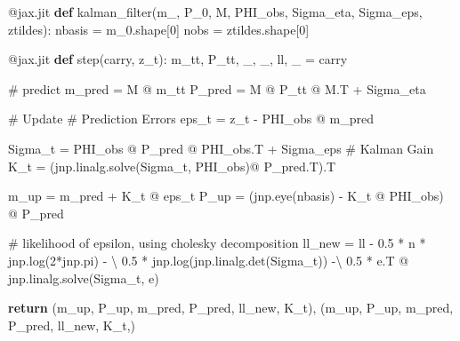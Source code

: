 \documentclass[
]{report}
\newenvironment{Shaded}{\begin{snugshade}}{\end{snugshade}}
\newcommand{\AttributeTok}[1]{\textcolor[rgb]{0.40,0.45,0.13}{#1}}
\newcommand{\CommentTok}[1]{\textcolor[rgb]{0.37,0.37,0.37}{#1}}
\newcommand{\ControlFlowTok}[1]{\textcolor[rgb]{0.00,0.23,0.31}{\textbf{#1}}}
\newcommand{\DecValTok}[1]{\textcolor[rgb]{0.68,0.00,0.00}{#1}}
\newcommand{\FloatTok}[1]{\textcolor[rgb]{0.68,0.00,0.00}{#1}}
\newcommand{\KeywordTok}[1]{\textcolor[rgb]{0.00,0.23,0.31}{\textbf{#1}}}
\newcommand{\NormalTok}[1]{\textcolor[rgb]{0.00,0.23,0.31}{#1}}
\newcommand{\OperatorTok}[1]{\textcolor[rgb]{0.37,0.37,0.37}{#1}}
\theoremstyle{plain}
\theoremstyle{plain}
\theoremstyle{plain}
\theoremstyle{remark}
\begin{document}
\begin{Shaded}
\begin{Highlighting}[]
\AttributeTok{@jax.jit}
\KeywordTok{def}\NormalTok{ kalman\_filter(m\_, P\_0, M, PHI\_obs, Sigma\_eta, Sigma\_eps, ztildes):}
\NormalTok{    nbasis }\OperatorTok{=}\NormalTok{ m\_0.shape[}\DecValTok{0}\NormalTok{]}
\NormalTok{    nobs }\OperatorTok{=}\NormalTok{ ztildes.shape[}\DecValTok{0}\NormalTok{]}

    \AttributeTok{@jax.jit}
    \KeywordTok{def}\NormalTok{ step(carry, z\_t):}
\NormalTok{        m\_tt, P\_tt, \_, \_, ll, \_ }\OperatorTok{=}\NormalTok{ carry}

        \CommentTok{\# predict}
\NormalTok{        m\_pred }\OperatorTok{=}\NormalTok{ M }\OperatorTok{@}\NormalTok{ m\_tt}
\NormalTok{        P\_pred }\OperatorTok{=}\NormalTok{ M }\OperatorTok{@}\NormalTok{ P\_tt }\OperatorTok{@}\NormalTok{ M.T }\OperatorTok{+}\NormalTok{ Sigma\_eta}

        \CommentTok{\# Update}
        \CommentTok{\# Prediction Errors}
\NormalTok{        eps\_t }\OperatorTok{=}\NormalTok{ z\_t }\OperatorTok{{-}}\NormalTok{ PHI\_obs }\OperatorTok{@}\NormalTok{ m\_pred}

\NormalTok{        Sigma\_t }\OperatorTok{=}\NormalTok{ PHI\_obs }\OperatorTok{@}\NormalTok{ P\_pred }\OperatorTok{@}\NormalTok{ PHI\_obs.T }\OperatorTok{+}\NormalTok{ Sigma\_eps}
        \CommentTok{\# Kalman Gain}
\NormalTok{        K\_t }\OperatorTok{=}\NormalTok{ (jnp.linalg.solve(Sigma\_t, PHI\_obs)}\OperatorTok{@}\NormalTok{ P\_pred.T).T}

\NormalTok{        m\_up }\OperatorTok{=}\NormalTok{ m\_pred }\OperatorTok{+}\NormalTok{ K\_t }\OperatorTok{@}\NormalTok{ eps\_t}
\NormalTok{        P\_up }\OperatorTok{=}\NormalTok{ (jnp.eye(nbasis) }\OperatorTok{{-}}\NormalTok{ K\_t }\OperatorTok{@}\NormalTok{ PHI\_obs) }\OperatorTok{@}\NormalTok{ P\_pred}

        \CommentTok{\# likelihood of epsilon, using cholesky decomposition}
\NormalTok{        ll\_new }\OperatorTok{=}\NormalTok{ ll }\OperatorTok{{-}} \FloatTok{0.5} \OperatorTok{*}\NormalTok{ n }\OperatorTok{*}\NormalTok{ jnp.log(}\DecValTok{2}\OperatorTok{*}\NormalTok{jnp.pi) }\OperatorTok{{-}} \OperatorTok{\textbackslash{}}
            \FloatTok{0.5} \OperatorTok{*}\NormalTok{ jnp.log(jnp.linalg.det(Sigma\_t)) }\OperatorTok{{-}\textbackslash{}}
            \FloatTok{0.5} \OperatorTok{*}\NormalTok{ e.T }\OperatorTok{@}\NormalTok{ jnp.linalg.solve(Sigma\_t, e)}

        \ControlFlowTok{return}\NormalTok{ (m\_up, P\_up, m\_pred, P\_pred, ll\_new, K\_t), (m\_up, P\_up, m\_pred, P\_pred, ll\_new, K\_t,)}


\end{Highlighting}
\end{Shaded}
\end{document}
